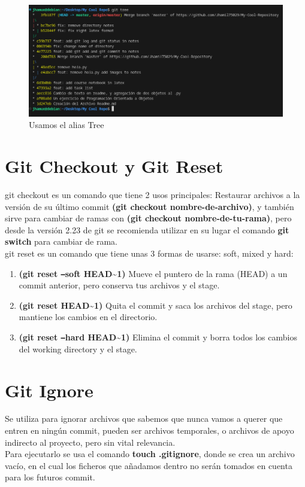 \documentclass[13pt]{article}
\begin{document}
\begin{figure}[H]
	\centering
	\includegraphics[scale = 0.4]{Images/alias2.png}
	\caption {\small Usamos el alias Tree}
\end{figure}

\section{Git Checkout y Git Reset}
git checkout es un comando que tiene 2 usos principales: Restaurar archivos a la versión de su último commit \textbf{(git checkout nombre-de-archivo)}, y también sirve para cambiar de ramas con \textbf{(git checkout nombre-de-tu-rama)}, pero desde la versión 2.23 de git se recomienda utilizar en su lugar el comando \textbf{git switch} para cambiar de rama.\\

git reset es un comando que tiene unas 3 formas de usarse: soft, mixed y hard:
\begin{enumerate}
	\item \textbf{(git reset \texttt{--}soft HEAD\textasciitilde1)} Mueve el puntero de la rama (HEAD) a un commit anterior, pero conserva tus archivos y el stage.
	\item \textbf{(git reset HEAD\textasciitilde1)} Quita el commit y saca los archivos del stage, pero mantiene los cambios en el directorio.
	\item \textbf{(git reset \texttt{--}hard HEAD\textasciitilde1)} Elimina el commit y borra todos los cambios del working directory y el stage.
\end{enumerate}

\section{Git Ignore}
Se utiliza para ignorar archivos que sabemos que nunca vamos a querer que entren en ningún commit, pueden ser archivos temporales, o archivos de apoyo indirecto al proyecto, pero sin vital relevancia.\\
Para ejecutarlo se usa el comando \textbf{touch .gitignore}, donde se crea un archivo vacío, en el cual los ficheros que añadamos dentro no serán tomados en cuenta para los futuros commit.\\
\end{document}
